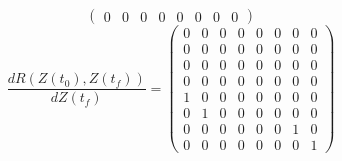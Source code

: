 \begin{itemize}
\begin{equation}
\begin{pmatrix}
0 & 0 & 0 & 0 & 0 & 0 & 0 & 0
\end{pmatrix}
\end{equation}
\begin{equation}
\dfrac{d R(Z(t_0),Z(t_f))}{d Z(t_f)} = \begin{pmatrix}
0 & 0 & 0 & 0 & 0 & 0 & 0 & 0 \\ 
0 & 0 & 0 & 0 & 0 & 0 & 0 & 0 \\ 
0 & 0 & 0 & 0 & 0 & 0 & 0 & 0 \\ 
0 & 0 & 0 & 0 & 0 & 0 & 0 & 0 \\
1 & 0 & 0 & 0 & 0 & 0 & 0 & 0 \\
0 & 1 & 0 & 0 & 0 & 0 & 0 & 0 \\
0 & 0 & 0 & 0 & 0 & 0 & 1 & 0 \\
0 & 0 & 0 & 0 & 0 & 0 & 0 & 1
\end{pmatrix}
\end{equation}
\end{itemize}





















